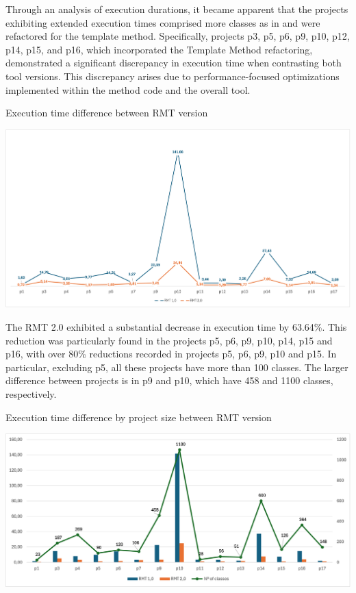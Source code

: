 

Through an analysis of execution durations, it became apparent that the projects exhibiting extended execution times comprised more classes as in  and were refactored for the template method. Specifically, projects p3, p5, p6, p9, p10, p12, p14, p15, and p16, which incorporated the Template Method refactoring, demonstrated a significant discrepancy in execution time when contrasting both tool versions. This discrepancy arises due to performance-focused optimizations implemented within the method code and the overall tool.

\begin{graph}[ht!]
\caption{Execution time difference between RMT version}
\label{fig-time-chart}
\includegraphics[width =\textwidth]{Chapter-5/Figures/time-diff.png}
\end{graph}
\FloatBarrier

The RMT 2.0 exhibited a substantial decrease in execution time by 63.64\%. This reduction was particularly found in the projects p5, p6, p9, p10, p14, p15 and p16, with over 80\% reductions recorded in projects p5, p6, p9, p10 and p15. In particular, excluding p5, all these projects have more than 100 classes. The larger difference between projects is in p9 and p10, which have 458 and 1100 classes, respectively. 

\begin{graph}[ht!]
\caption{Execution time difference by project size between RMT version}
\label{fig-time-by-size}
\includegraphics[width =\textwidth]{Chapter-5/Figures/time-per-project-size.png}
\end{graph}
\FloatBarrier

